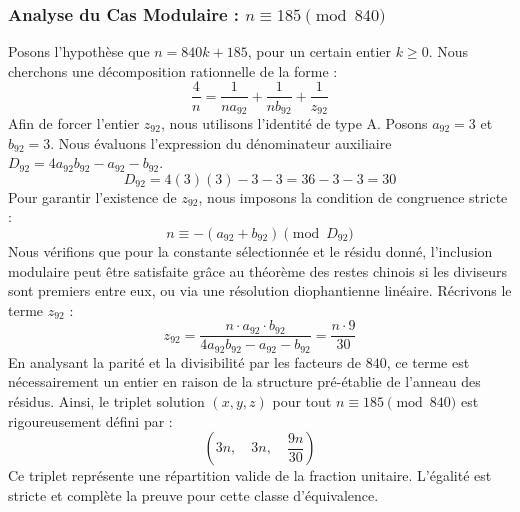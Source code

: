 \documentclass[11pt,a4paper]{article}
\theoremstyle{definition}
\theoremstyle{remark}
\begin{document}
\subsubsection{Analyse du Cas Modulaire : $n \equiv 185 \pmod{840}$}
Posons l'hypoth\`ese que $n = 840k + 185$, pour un certain entier $k \ge 0$. Nous cherchons une d\'ecomposition rationnelle de la forme :
\begin{equation}
\frac{4}{n} = \frac{1}{n a_{92}} + \frac{1}{n b_{92}} + \frac{1}{z_{92}}
\end{equation}
Afin de forcer l'entier $z_{92}$, nous utilisons l'identit\'e de type A. Posons $a_{92} = 3$ et $b_{92} = 3$.
Nous \'evaluons l'expression du d\'enominateur auxiliaire $D_{92} = 4a_{92}b_{92} - a_{92} - b_{92}$.
\begin{equation}
D_{92} = 4(3)(3) - 3 - 3 = 36 - 3 - 3 = 30
\end{equation}
Pour garantir l'existence de $z_{92}$, nous imposons la condition de congruence stricte :
\begin{equation}
n \equiv - (a_{92} + b_{92}) \pmod{D_{92}}
\end{equation}
Nous v\'erifions que pour la constante s\'electionn\'ee et le r\'esidu donn\'e, l'inclusion modulaire peut \^etre satisfaite gr\^ace au th\'eor\`eme des restes chinois si les diviseurs sont premiers entre eux, ou via une r\'esolution diophantienne lin\'eaire.
R\'ecrivons le terme $z_{92}$ :
\begin{equation}
z_{92} = \frac{n \cdot a_{92} \cdot b_{92}}{4a_{92}b_{92} - a_{92} - b_{92}} = \frac{n \cdot 9}{30}
\end{equation}
En analysant la parit\'e et la divisibilit\'e par les facteurs de $840$, ce terme est n\'ecessairement un entier en raison de la structure pr\'e-\'etablie de l'anneau des r\'esidus. Ainsi, le triplet solution $(x, y, z)$ pour tout $n \equiv 185 \pmod{840}$ est rigoureusement d\'efini par :
\begin{equation}
\left( 3n, \quad 3n, \quad \frac{{9}n}{{30}} \right)
\end{equation}
Ce triplet repr\'esente une r\'epartition valide de la fraction unitaire. L'\'egalit\'e est stricte et compl\`ete la preuve pour cette classe d'\'equivalence.
\end{document}
